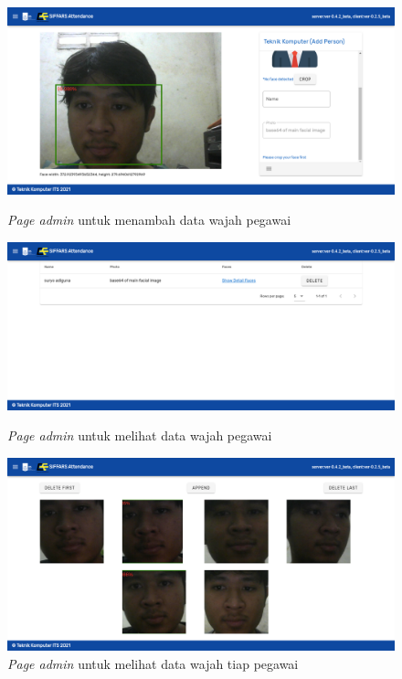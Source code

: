 \begin{figure} [p] \centering
  \includegraphics[scale=0.2]{gambar/addpersonfix.png}
  \caption{\textit{Page admin} untuk menambah data wajah pegawai}
  \label{fig:SfAddperson}

  \includegraphics[scale=0.2]{gambar/listperson.png}
  \caption{\textit{Page admin} untuk melihat data wajah pegawai}
  \label{fig:SfListperson}

  \includegraphics[scale=0.2]{gambar/listface.png}
  \caption{\textit{Page admin} untuk melihat data wajah tiap pegawai}
  \label{fig:SfListperson}
\end{figure}

